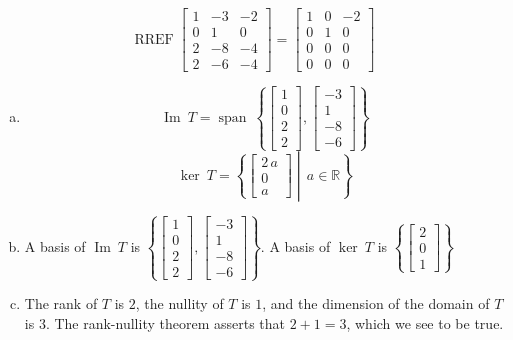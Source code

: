 \begin{exerciseAnswer} 


\[\operatorname{RREF} \left[\begin{array}{ccc}
1 & -3 & -2 \\
0 & 1 & 0 \\
2 & -8 & -4 \\
2 & -6 & -4
\end{array}\right] = \left[\begin{array}{ccc}
1 & 0 & -2 \\
0 & 1 & 0 \\
0 & 0 & 0 \\
0 & 0 & 0
\end{array}\right] \]


\begin{enumerate}[(a)]
\item \[\operatorname{Im}\ T = \operatorname{span}\  \left\{ \left[\begin{array}{c}
1 \\
0 \\
2 \\
2
\end{array}\right] , \left[\begin{array}{c}
-3 \\
1 \\
-8 \\
-6
\end{array}\right] \right\} \]\[\operatorname{ker}\ T =  \left\{ \left[\begin{array}{c}
2 \, a \\
0 \\
a
\end{array}\right] \middle|\,a\in\mathbb{R}\right\} \]
\item  A basis of \(\operatorname{Im}\ T\) is \( \left\{ \left[\begin{array}{c}
1 \\
0 \\
2 \\
2
\end{array}\right] , \left[\begin{array}{c}
-3 \\
1 \\
-8 \\
-6
\end{array}\right] \right\} \). A basis of \(\operatorname{ker}\ T\) is \( \left\{ \left[\begin{array}{c}
2 \\
0 \\
1
\end{array}\right] \right\} \)
\item  The rank of \(T\) is \( 2 \), the nullity of \(T\) is \( 1 \), and the dimension of the domain of \(T\) is \( 3 \). The rank-nullity theorem asserts that \( 2 + 1 = 3 \), which we see to be true. 
\end{enumerate}
    
\end{exerciseAnswer}
    

